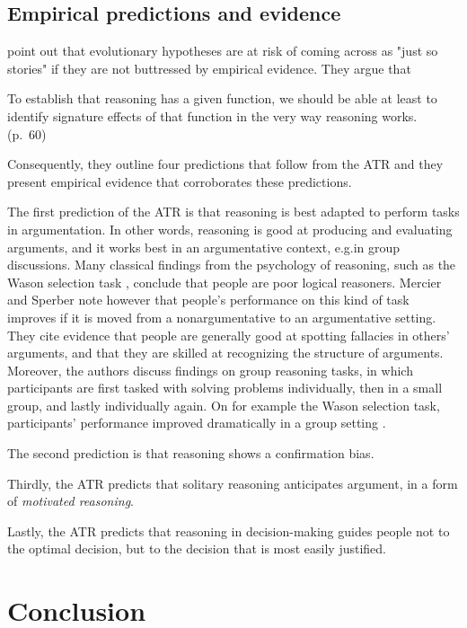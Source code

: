 \subsection{Empirical predictions and evidence}


\citet{MS11} point out that evolutionary hypotheses are at risk of coming across as "just so stories" if they are not buttressed by empirical evidence. They argue that
\begin{quoting}
    To establish that reasoning has a given function, we should be able at least to identify signature effects of that function in the very way reasoning works.
    \hfill (p.~60)
\end{quoting}
Consequently, they outline four predictions that follow from the ATR and they present empirical evidence that corroborates these predictions.

The first prediction of the ATR is that reasoning is best adapted to perform tasks in argumentation. In other words, reasoning is good at producing and evaluating arguments, and it works best in an argumentative context, e.g.\@ in group discussions.
Many classical findings from the psychology of reasoning, such as the Wason selection task \citep{Wason68}, conclude that people are poor logical reasoners. Mercier and Sperber note however that people's performance on this kind of task improves if it is moved from a nonargumentative to an argumentative setting. They cite evidence that people are generally good at spotting fallacies in others' arguments, and that they are skilled at recognizing the structure of arguments.
Moreover, the authors discuss findings on group reasoning tasks, in which participants are first tasked with solving problems individually, then in a small group, and lastly individually again. On for example the Wason selection task, participants' performance improved dramatically in a group setting \citep{Moshman98}.

The second prediction is that reasoning shows a confirmation bias.

Thirdly, the ATR predicts that solitary reasoning anticipates argument, in a form of \emph{motivated reasoning}.

Lastly, the ATR predicts that reasoning in decision-making guides people not to the optimal decision, but to the decision that is most easily justified.

\section{Conclusion}

